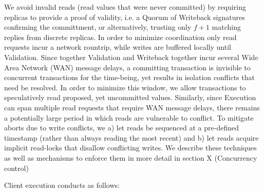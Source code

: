 We avoid invalid reads (read values that were never committed) by requiring replicas to provide a proof of validity, i.e. a Quorum of Writeback signatures  confirming the committment, or alternatively, trusting only $f+1$ matching replies from discrete replicas. In order to minimize coordination only read requests incur a network rountrip, while writes are buffered locally until Validation. 
Since together Validation and Writeback together incur several Wide Area Network (WAN) message delays, a committing transaction is invisible to concurrent transactions for the time-being, yet results in isolation conflicts that need be resolved. In order to minimize this window, we allow transactions to speculatively read proposed, yet uncommitted values. Similarly, since Execution can span multiple read requests that require WAN message delays, there remains a potentially large period in which reads are vulnerable to conflict. To mitigate aborts due to write conflicts, we a) let reads be sequenced at a pre-defined timestamp (rather than always reading the most recent) and b) let reads acquire implicit read-locks that disallow conflicting writes. We describe these techniques as well as mechanisms to enforce them in more detail in section X (Concurrency control) 


Client execution conducts as follows:

